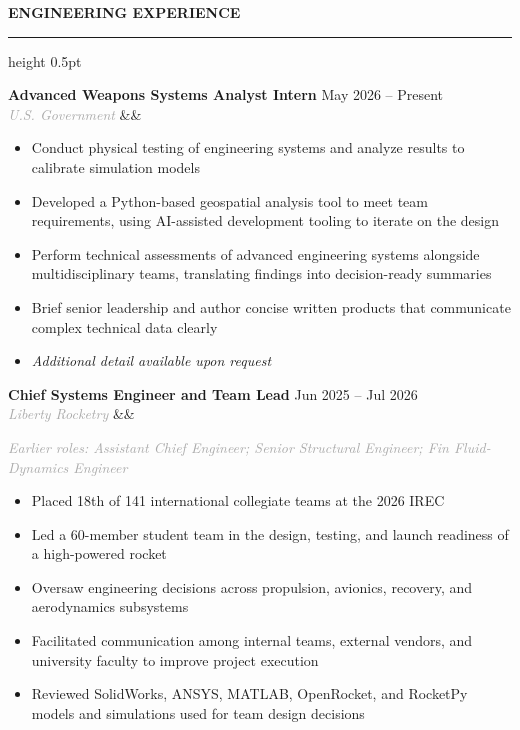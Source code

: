 \documentclass[10pt,letterpaper]{article}
\renewcommand{\section}[1]{
    \vspace{5pt}
    {\normalsize\bfseries\textcolor{navyblue}{\MakeUppercase{#1}}}
    \vspace{0pt}
    
    {\color{navyblue}\hrule height 0.5pt}
    \vspace{3pt}
}
\newcommand{\resumeEntry}[4]{
    \textbf{#1} \hfill \textcolor{medgray}{#2} \\
    \textit{\textcolor{darkgray}{#3}} \ifx&#4&\else\hfill \textcolor{medgray}{#4}\fi
    \vspace{0pt}
}
\begin{document}
\section{Engineering Experience}

\resumeEntry{Advanced Weapons Systems Analyst Intern}{May 2026 -- Present}{U.S. Government}{}
\begin{itemize}
    \item Conduct physical testing of engineering systems and analyze results to calibrate simulation models
    \item Developed a Python-based geospatial analysis tool to meet team requirements, using AI-assisted development tooling to iterate on the design
    \item Perform technical assessments of advanced engineering systems alongside multidisciplinary teams, translating findings into decision-ready summaries
    \item Brief senior leadership and author concise written products that communicate complex technical data clearly
    \item \textit{Additional detail available upon request}
\end{itemize}

\vspace{1pt}

\resumeEntry{Chief Systems Engineer and Team Lead}{Jun 2025 -- Jul 2026}{Liberty Rocketry}{}

\vspace{1pt}
{\small \textit{\textcolor{darkgray}{Earlier roles: Assistant Chief Engineer; Senior Structural Engineer; Fin Fluid-Dynamics Engineer}}}
\begin{itemize}
    \item Placed 18th of 141 international collegiate teams at the 2026 IREC
    \item Led a 60-member student team in the design, testing, and launch readiness of a high-powered rocket
    \item Oversaw engineering decisions across propulsion, avionics, recovery, and aerodynamics subsystems
    \item Facilitated communication among internal teams, external vendors, and university faculty to improve project execution
    \item Reviewed SolidWorks, ANSYS, MATLAB, OpenRocket, and RocketPy models and simulations used for team design decisions
\end{itemize}

\vspace{1pt}
\end{document}
